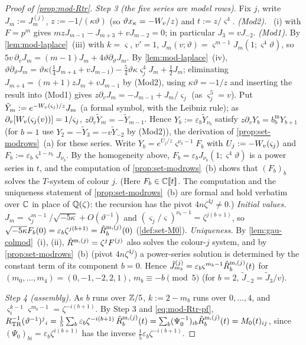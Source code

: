 \begin{proof}[Proof of \cref{prop:mod-Rtr}]
\emph{Step 3 (the five series are model rows).} Fix $j$, write $J_m:=J^{(j)}_m$, $z:=-1/(\kappa\vartheta)$ (so $\vartheta x_\kappa=-W_{v}/z$) and $t:=z/\varsigma^4$. \emph{(Mod2).} ~(i) with $F=p^m$ gives $mzJ_{m-1}-J_{m+3}+vJ_{m-2}=0$; in particular $J_3=vJ_{-2}$. \emph{(Mod1).} By \cref{lem:mod-laplace}~(iii) with $k=\varsigma$, $v'=1$, $J_m(v;\vartheta)=\varsigma^{m-1}J_m(1;\varsigma^4\vartheta)$, so $5v\,\partial_vJ_m=(m-1)J_m+4\vartheta\partial_\vartheta J_m$. By \cref{lem:mod-laplace}~(iv), $\vartheta\partial_\vartheta J_m=\vartheta\kappa\big(\tfrac14J_{m+4}+vJ_{m-1}\big)-\tfrac54\vartheta\kappa\varsigma_j^4J_m+\tfrac12J_m$; eliminating $J_{m+4}=(m+1)zJ_m+vJ_{m-1}$ by (Mod2), using $\kappa\vartheta=-1/z$ and inserting the result into (Mod1) gives $z\partial_vJ_m=-J_{m-1}+J_m/\varsigma_j$ (as $\varsigma_j^5=v$). Put $\tilde Y_m:=e^{-W_{v}(\varsigma_j)/z}J_m$ (a formal symbol, with the Leibniz rule); as $\partial_v[W_{v}(\varsigma_j(v))]=1/\varsigma_j$, $z\partial_v\tilde Y_m=-\tilde Y_{m-1}$. Hence $Y_b:=\varepsilon_b\tilde Y_{\nu_b}$ satisfy $z\partial_vY_b=b^{\mathrm m}_bY_{b+1}$ (for $b=1$ use $Y_2=-\tilde Y_3=-v\tilde Y_{-2}$ by (Mod2)), the derivation of \cref{prop:set-modrows}~(a) for these series. Write $Y_b=e^{U_j/z}\varsigma^{\nu_b-1}F_b$ with $U_j:=-W_{v}(\varsigma_j)$ and $F_b:=\varepsilon_b\varsigma^{1-\nu_b}J_{\nu_b}$. By the homogeneity above, $F_b=\varepsilon_bJ_{\nu_b}(1;\varsigma^4\vartheta)$ is a power series in $t$, and the computation of \cref{prop:set-modrows}~(b) shows that $(F_b)_b$ solves the $T$-system of colour $j$. (Here $F_b\in\mathbb{C}[\![ t ]\!]$. The computation and the uniqueness statement of \cref{prop:set-modrows}~(b) are formal and hold verbatim over $\mathbb{C}$ in place of $\mathbb{Q}(\zeta)$: the recursion has the pivot $4n\zeta^{4j}\neq0$.) \emph{Initial values.} $J_m=\varsigma_j^{m-1}/\sqrt{-5\kappa}+O(\vartheta^{-1})$ and $(\varsigma_j/\varsigma)^{\nu_b-1}=\zeta^{j(b+1)}$, so $\sqrt{-5\kappa}F_b(0)=\varepsilon_b\zeta^{j(b+1)}=\hat{R}^{\mathrm m,(j)}_b(0)$ (\cref{def:set-M0}). \emph{Uniqueness.} By \cref{lem:gau-colmod}~(i), (ii), $\hat{R}^{\mathrm m,(j)}=\zeta^jF^{(j)}$ also solves the colour-$j$ system, and by \cref{prop:set-modrows}~(b) (pivot $4n\zeta^{4j}$) a power-series solution is determined by the constant term of its component $b=0$. Hence $\tilde J^{(j)}_{m_b}=\varepsilon_b\varsigma^{m_b-1}\hat{R}^{\mathrm m,(j)}_b(t)$ for $(m_0,\dots,m_4)=(0,-1,-2,2,1)$, $m_b\equiv -b\pmod 5$ (for $b=2$, $\tilde J_{-2}=\tilde J_3/v$).

\emph{Step 4 (assembly).} As $b$ runs over $\mathbb{Z}/5$, $k:=2-m_b$ runs over $0,\dots,4$, and $\varsigma_i^{k-1}\varsigma^{m_b-1}=\zeta^{-i(b+1)}$. By Step 3 and \eqref{eq:mod-Rtr-pf}, $R_{\mathrm{TR}}^{-1}(\vartheta^{-1})^j{}_i=\frac15\sum_b\varepsilon_b\zeta^{-i(b+1)}\,\hat{R}^{\mathrm m,(j)}_b(t)=\sum_b(\Psi_0^{-1})_{ib}\hat{R}^{\mathrm m,(j)}_b(t)=M_{0}(t)_{ij}$, since $(\Psi_0)_{bi}=\varepsilon_b\zeta^{i(b+1)}$ has the inverse $\frac15\varepsilon_b\zeta^{-i(b+1)}$.


\end{proof}
